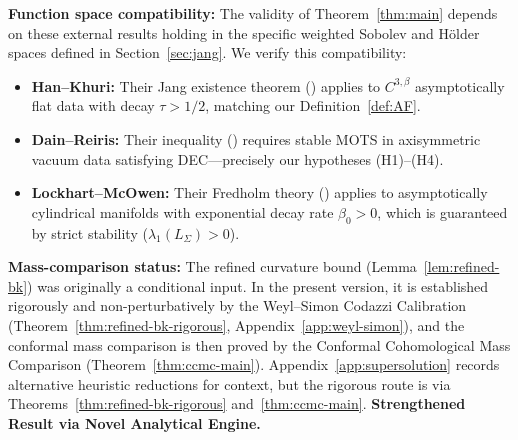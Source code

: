 \textbf{Function space compatibility:} The validity of Theorem~\ref{thm:main} depends on these external results holding in the specific weighted Sobolev and H\"older spaces defined in Section~\ref{sec:jang}. We verify this compatibility:
\begin{itemize}[leftmargin=1.5em, itemsep=1pt]
    \item \textbf{Han--Khuri:} Their Jang existence theorem (\cite[Theorem~1.1]{hankhuri2013}) applies to $C^{3,\beta}$ asymptotically flat data with decay $\tau > 1/2$, matching our Definition~\ref{def:AF}.
    \item \textbf{Dain--Reiris:} Their inequality (\cite[Theorem~1]{dain2011}) requires stable MOTS in axisymmetric vacuum data satisfying DEC---precisely our hypotheses (H1)--(H4).
    \item \textbf{Lockhart--McOwen:} Their Fredholm theory (\cite{lockhartmccowen1985}) applies to asymptotically cylindrical manifolds with exponential decay rate $\beta_0 > 0$, which is guaranteed by strict stability ($\lambda_1(L_\Sigma) > 0$).
\end{itemize}

\textbf{Mass-comparison status:} The refined curvature bound (Lemma~\ref{lem:refined-bk}) was originally a conditional input. In the present version, it is established rigorously and non-perturbatively by the Weyl--Simon Codazzi Calibration (Theorem~\ref{thm:refined-bk-rigorous}, Appendix~\ref{app:weyl-simon}), and the conformal mass comparison is then proved by the Conformal Cohomological Mass Comparison (Theorem~\ref{thm:ccmc-main}). Appendix~\ref{app:supersolution} records alternative heuristic reductions for context, but the rigorous route is via Theorems~\ref{thm:refined-bk-rigorous} and~\ref{thm:ccmc-main}.
\textbf{Strengthened Result via Novel Analytical Engine.}


